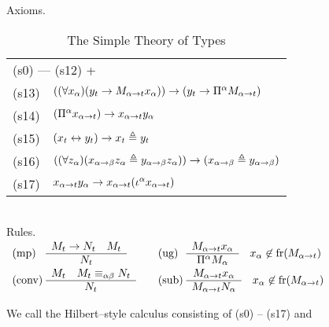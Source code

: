 \begin{table}
\caption{The Simple Theory of Types}
\label{tab:styp}
\mbox{\sc Axioms.} \\[2mm]
\begin{tabular}{ll}
\multicolumn{2}{l}{(s0) --- (s12) +} \\
(s13) & $((\forall x_{\alpha})(y_t \rightarrow M_{\alpha\rightarrow t}x_{\alpha}))
    \rightarrow (y_t \rightarrow \Pi^{\alpha}M_{\alpha\rightarrow t})$ \\
(s14) & $(\Pi^{\alpha} x_{\alpha \rightarrow t}) \rightarrow x_{\alpha\rightarrow t}y_{\alpha}$ \\
(s15) & $(x_{t} \leftrightarrow y_{t}) \rightarrow x_t \triangleq y_t$ \\
(s16) & $((\forall z_{\alpha})(x_{\alpha\rightarrow\beta}z_{\alpha}
    \triangleq y_{\alpha\rightarrow\beta}z_{\alpha})) \rightarrow
    (x_{\alpha\rightarrow\beta} \triangleq y_{\alpha\rightarrow\beta})$ \\
(s17) & $x_{\alpha\rightarrow t}y_{\alpha} \rightarrow x_{\alpha\rightarrow t}
    (\iota^{\alpha}x_{\alpha \rightarrow t})$
\end{tabular}
\\[2mm]
\mbox{\sc Rules.} \\
$\begin{array}{l@{\;}l@{\qquad}l@{\;}l}
\mbox{\rm (mp)} & \begin{array}{c}
              M_t \pf N_t \quad M_t \\\hline
          N_t
          \end{array}
        &
\mbox{\rm (ug)} & \begin{array}{c}
           M_{\alpha \pf t}x_{\alpha} \\\hline
           \Pi^{\alpha}M_{\alpha}
           \end{array}
           \quad x_{\alpha} \not\in \fr(M_{\alpha\pf t})
         \\
\mbox{\rm (conv)} & \begin{array}{c}
           M_t \quad M_t \equiv_{\alpha\beta} N_t \\\hline
           N_t
           \end{array}
          &
\mbox{\rm (sub)} & \begin{array}{c}
           M_{\alpha \pf t}x_{\alpha} \\\hline
           M_{\alpha\pf t}N_{\alpha}
           \end{array}
           \quad
           x_{\alpha} \not\in \fr(M_{\alpha\pf t})
\end{array}$
\end{table}
We call the Hilbert--style calculus consisting of (s0) -- (s17) and 
